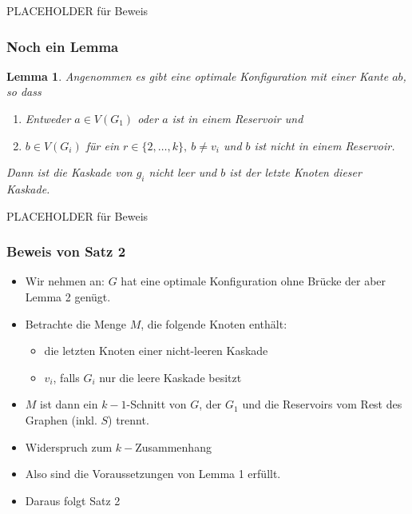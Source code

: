\documentclass{beamer}
\theoremstyle{definition}
\theoremstyle{plain}
\newtheorem{lem}[auf]{Lemma}
\begin{document}
\begin{frame}
PLACEHOLDER für Beweis
\end{frame}
\begin{frame}
\frametitle{Noch ein Lemma}
\begin{lem}
Angenommen es gibt eine optimale Konfiguration mit einer Kante $ab$, so dass 
\begin{enumerate}
\item Entweder $a\in V(G_1)$ oder $a$ ist in einem Reservoir und
\item $b\in V(G_i)$ für ein $r\in\lbrace 2,\dotsc,k\rbrace,~b\neq v_i$ und $b$ ist nicht in einem Reservoir.
\end{enumerate}
Dann ist die Kaskade von $g_i$ nicht leer und $b$ ist der letzte Knoten dieser Kaskade.
\end{lem}
\end{frame}
\begin{frame}
PLACEHOLDER für Beweis
\end{frame}
\begin{frame}
\frametitle{Beweis von Satz 2}
\begin{itemize}
\item Wir nehmen an: $G$ hat eine optimale Konfiguration ohne Brücke der aber Lemma 2 genügt.
\item Betrachte die Menge $M$, die folgende Knoten enthält:
\begin{itemize}
\item die letzten Knoten einer nicht-leeren Kaskade
\item $v_i$, falls $G_i$ nur die leere Kaskade besitzt
\end{itemize}
\item $M$ ist dann ein $k-1$-Schnitt von $G$, der $G_1$ und die Reservoirs vom Rest des Graphen (inkl. $S$) trennt.
\item Widerspruch zum $k-$Zusammenhang
\item Also sind die Voraussetzungen von Lemma 1 erfüllt.
\item Daraus folgt Satz 2
\end{itemize}
\end{frame}
\end{document}
